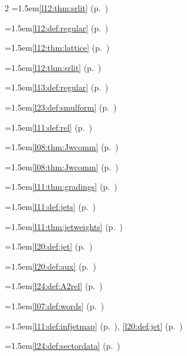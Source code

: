 \begin{multicols}{2}
\hangindent=1.5em\quad \ref{l12:thm:srlit} (p.~\pageref{l12:thm:srlit})\par
\hangindent=1.5em\quad \ref{l12:def:regular} (p.~\pageref{l12:def:regular})\par
\hangindent=1.5em\quad \ref{l12:thm:lattice} (p.~\pageref{l12:thm:lattice})\par
\hangindent=1.5em\quad \ref{l12:thm:srlit} (p.~\pageref{l12:thm:srlit})\par
\hangindent=1.5em\quad \ref{l13:def:regular} (p.~\pageref{l13:def:regular})\par
\hangindent=1.5em\quad \ref{l23:def:smulform} (p.~\pageref{l23:def:smulform})\par
\hangindent=1.5em\quad \ref{l11:def:rel} (p.~\pageref{l11:def:rel})\par
\hangindent=1.5em\quad \ref{l08:thm:Jwcomm} (p.~\pageref{l08:thm:Jwcomm})\par
\hangindent=1.5em\quad \ref{l08:thm:Jwcomm} (p.~\pageref{l08:thm:Jwcomm})\par
\hangindent=1.5em\quad \ref{l11:thm:gradings} (p.~\pageref{l11:thm:gradings})\par
\hangindent=1.5em\quad \ref{l11:def:jets} (p.~\pageref{l11:def:jets})\par
\hangindent=1.5em\quad \ref{l11:thm:jetweights} (p.~\pageref{l11:thm:jetweights})\par
\hangindent=1.5em\quad \ref{l20:def:jet} (p.~\pageref{l20:def:jet})\par
\hangindent=1.5em\quad \ref{l20:def:aux} (p.~\pageref{l20:def:aux})\par
\hangindent=1.5em\quad \ref{l24:def:A2rel} (p.~\pageref{l24:def:A2rel})\par
\hangindent=1.5em\quad \ref{l07:def:words} (p.~\pageref{l07:def:words})\par
\hangindent=1.5em\quad \ref{l11:def:infjetmap} (p.~\pageref{l11:def:infjetmap}), \ref{l20:def:jet} (p.~\pageref{l20:def:jet})\par
\hangindent=1.5em\quad \ref{l24:def:sectordata} (p.~\pageref{l24:def:sectordata})\par

\end{multicols}
